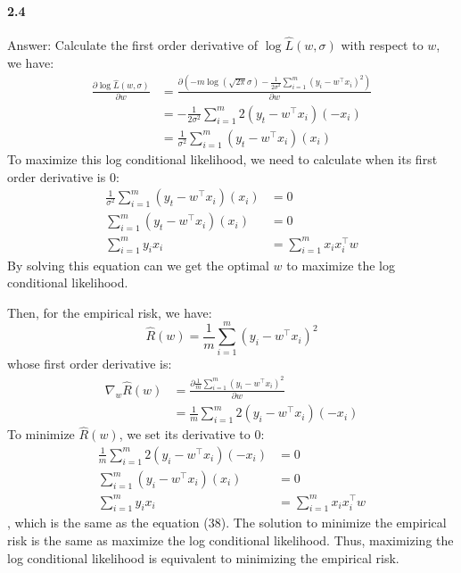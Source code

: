 \documentclass[11pt]{article}
\begin{document}
\paragraph{2.4}
Answer:
\newline
Calculate the first order derivative of $ \log{\hat{L}(w, \sigma)}$ with respect to $w$, we have:
\begin{equation}
    \begin{split}
        \frac{\partial  \log{\hat{L}(w, \sigma)}}{\partial w}
        &= \frac{\partial (-m\log{(\sqrt{2\pi}\sigma)} -\frac{1}{2\sigma^2}\sum_{i=1}^m(y_i-w^\top x_i)^2)}{\partial w}\\
        &= -\frac{1}{2\sigma^2}\sum_{i=1}^m2(y_t-w^\top x_i)(-x_i)\\
        &= \frac{1}{\sigma^2}\sum_{i=1}^m(y_t-w^\top x_i)(x_i)
    \end{split}
\end{equation}
To maximize this log conditional likelihood, we need to calculate when its first order derivative is 0:
\begin{equation}
    \begin{split}
        \frac{1}{\sigma^2}\sum_{i=1}^m(y_t-w^\top x_i)(x_i) &= 0\\
        \sum_{i=1}^m(y_t-w^\top x_i)(x_i) &= 0\\
        \sum_{i=1}^my_ix_i&=\sum_{i=1}^m x_i x_i^\top w
    \end{split}
\end{equation}
By solving this equation can we get the optimal $w$ to maximize the log conditional likelihood.

Then, for the empirical risk, we have:
\begin{equation}
    \hat{R}(w) = \frac{1}{m}\sum_{i=1}^m(y_i-w^\top x_i)^2
\end{equation}
whose first order derivative is:
\begin{equation}
    \begin{split}
        \nabla_w\hat{R}(w) &= \frac{\partial  \frac{1}{m}\sum_{i=1}^m(y_i-w^\top x_i)^2}{\partial w} \\
        &= \frac{1}{m}\sum_{i=1}^m2(y_i-w^\top x_i)(-x_i)
    \end{split}
\end{equation}
To minimize $\hat{R}(w)$, we set its derivative to 0:
\begin{equation}
    \begin{split}
        \frac{1}{m}\sum_{i=1}^m2(y_i-w^\top x_i)(-x_i) &= 0\\
        \sum_{i=1}^m(y_i-w^\top x_i)(x_i) &= 0 \\
        \sum_{i=1}^my_i x_i &= \sum_{i=1}^m x_i x_i^\top w
    \end{split}
\end{equation}
, which is the same as the equation (38). The solution to minimize the empirical risk is the same as maximize the log conditional likelihood. Thus, maximizing the log conditional likelihood is equivalent to minimizing the empirical risk.
\end{document}
